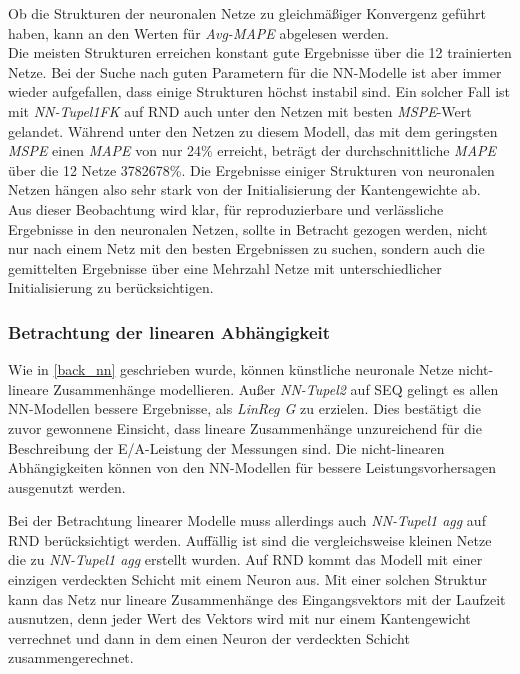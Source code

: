 \documentclass[
	12pt,
	a4paper,
	BCOR10mm,
	DIV14,
	listof=totoc,
	bibliography=totoc,
	headsepline
]{scrreprt}
\begin{document}
Ob die Strukturen der neuronalen Netze zu gleichmäßiger Konvergenz geführt haben, kann an den Werten für \textit{Avg-MAPE} abgelesen werden.\\
Die meisten Strukturen erreichen konstant gute Ergebnisse über die 12 trainierten Netze.
Bei der Suche nach guten Parametern für die NN-Modelle ist aber immer wieder aufgefallen, dass einige Strukturen höchst instabil sind.
Ein solcher Fall ist mit \textit{NN-Tupel1FK} auf RND auch unter den Netzen mit besten \textit{MSPE}-Wert gelandet.
Während unter den Netzen zu diesem Modell, das mit dem geringsten \textit{MSPE} einen \textit{MAPE} von nur 24\% erreicht, beträgt der durchschnittliche \textit{MAPE} über die 12 Netze 3782678\%.
Die Ergebnisse einiger Strukturen von neuronalen Netzen hängen also sehr stark von der Initialisierung der Kantengewichte ab.\\
Aus dieser Beobachtung wird klar, für reproduzierbare und verlässliche Ergebnisse in den neuronalen Netzen, sollte in Betracht gezogen werden, nicht nur nach einem Netz mit den besten Ergebnissen zu suchen, sondern auch die gemittelten Ergebnisse über eine Mehrzahl Netze mit unterschiedlicher Initialisierung zu berücksichtigen.

\subsubsection{Betrachtung der linearen Abhängigkeit}
Wie in \ref{back_nn} geschrieben wurde, können künstliche neuronale Netze nicht-lineare Zusammenhänge modellieren.
Außer \textit{NN-Tupel2} auf SEQ gelingt es allen NN-Modellen bessere Ergebnisse, als \textit{LinReg G} zu erzielen. Dies bestätigt die zuvor gewonnene Einsicht, dass lineare Zusammenhänge unzureichend für die Beschreibung der E/A-Leistung der Messungen sind.
Die nicht-linearen Abhängigkeiten können von den NN-Modellen für bessere Leistungsvorhersagen ausgenutzt werden.\medskip

Bei der Betrachtung linearer Modelle muss allerdings auch \textit{NN-Tupel1 agg} auf RND berücksichtigt werden.
Auffällig ist sind die vergleichsweise kleinen Netze die zu \textit{NN-Tupel1 agg} erstellt wurden.
Auf RND kommt das Modell mit einer einzigen verdeckten Schicht mit einem Neuron aus.
Mit einer solchen Struktur kann das Netz nur lineare Zusammenhänge des Eingangsvektors mit der Laufzeit ausnutzen, denn jeder Wert des Vektors wird mit nur einem Kantengewicht verrechnet und dann in dem einen Neuron der verdeckten Schicht zusammengerechnet.\medskip
\end{document}
